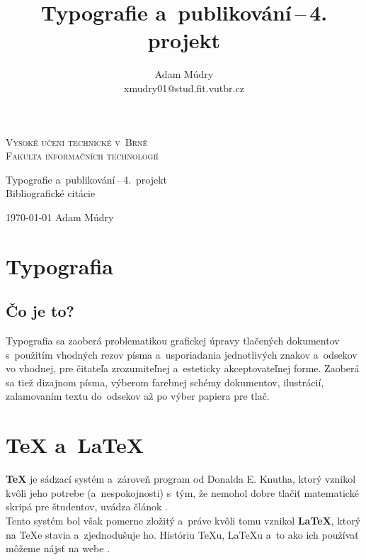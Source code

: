 \documentclass[a4paper, 11pt]{article}
\author{Adam Múdry\\xmudry01@stud.fit.vutbr.cz}
\title{Typografie a~publikování{\,}--{\,}4. projekt}
\begin{document}
  \begin{titlepage}
    \begin{center}
      \Huge\textsc{Vysoké učení technické v~Brně \\}
      \huge\textsc{Fakulta informačních technologií \\}
        

        \LARGE{Typografie a~publikování{\,}--{\,}4.~projekt \\}
        \Huge{Bibliografické citácie\\}

    \end{center}
    {\Large{{\today} \hfill Adam Múdry}}
  \end{titlepage}

  \section{Typografia}

  \subsection{Čo je to?}

  Typografia sa zaoberá problematikou grafickej úpravy tlačených dokumentov s~použitím vhodných rezov písma a~usporiadania jednotlivých znakov a~odsekov vo vhodnej, pre čitateľa zrozumiteľnej a~esteticky akceptovateľnej forme. Zaoberá sa tiež dizajnom písma, výberom farebnej schémy dokumentov, ilustrácií, zalamovaním textu do~odsekov až po výber papiera pre tlač.~\cite{wiki_sk_typography}

  \section{{\TeX} a~\LaTeX}

  {\textbf \TeX} je sádzací systém a~zároveň program od Donalda E. Knutha, ktorý vznikol kvôli jeho potrebe (a~nespokojnosti) s~tým, že nemohol dobre tlačiť matematické skripá pre študentov, uvádza článok \cite{simecek2013programujte}.\\

  \noindent Tento systém bol však pomerne zložitý a~práve kvôli tomu vznikol {\textbf \LaTeX}, ktorý na {\TeX}e stavia a~zjednodušuje ho. Históriu {\TeX}u, {\LaTeX}u a~to ako ich používať môžeme nájsť na webe \cite{martinek2010latex}.\\
\end{document}
